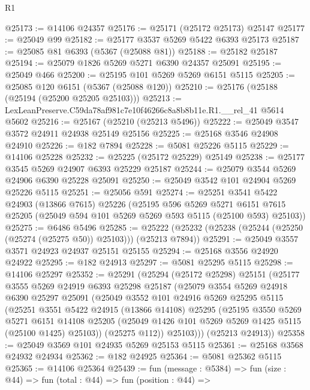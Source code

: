\begin{lexlean}{R1}
\begin{coremodule}
@25173 := @14106 @24357
@25176 := @25171 (@25172 @25173) @25147
@25177 := @25049 @99
@25182 := @25177 @3537 @5269 @5422 @6393 @25173
@25187 := @25085 @81 @6393 (@5367 (@25088 @81))
@25188 := @25182 @25187
@25194 := @25079 @1826 @5269 @5271 @6390 @24357 @25091
@25195 := @25049 @466
@25200 := @25195 @101 @5269 @5269 @6151 @5115
@25205 := @25085 @120 @6151 (@5367 (@25088 @120))
@25210 := @25176 (@25188 (@25194 (@25200 @25205 @25103)))
@25213 := LexLeanPreserve.C59da78af981c7e10f46266c8a8b8b11e.R1.__rel_41 @5614 @5602
@25216 := @25167 (@25210 (@25213 @5496))
@25222 := @25049 @3547 @3572 @24911 @24938 @25149 @25156
@25225 := @25168 @3546 @24908 @24910
@25226 := @182 @7894
@25228 := @5081 @25226 @5115
@25229 := @14106 @25228
@25232 := @25225 (@25172 @25229) @25149
@25238 := @25177 @3545 @5269 @24907 @6393 @25229 @25187
@25244 := @25079 @3544 @5269 @24906 @6390 @25228 @25091
@25250 := @25049 @3542 @101 @24904 @5269 @25226 @5115
@25251 := @25056 @591
@25274 := @25251
    @3541
    @5422
    @24903
    (@13866 @7615)
    @25226
    (@25195
      @596
      @5269
      @5271
      @6151
      @7615
      @25205
      (@25049 @594 @101 @5269 @5269 @593 @5115 (@25100 @593) @25103))
@25275 := @6486 @5496
@25285 := @25222 (@25232 (@25238 (@25244 (@25250 (@25274 (@25275 @50)) @25103))) (@25213 @7894))
@25291 := @25049 @3557 @3571 @24923 @24937 @25151 @25155
@25294 := @25168 @3556 @24920 @24922
@25295 := @182 @24913
@25297 := @5081 @25295 @5115
@25298 := @14106 @25297
@25352 := @25291
    (@25294
      (@25172 @25298)
      @25151
      (@25177
        @3555
        @5269
        @24919
        @6393
        @25298
        @25187
        (@25079
          @3554
          @5269
          @24918
          @6390
          @25297
          @25091
          (@25049
            @3552
            @101
            @24916
            @5269
            @25295
            @5115
            (@25251
              @3551
              @5422
              @24915
              (@13866 @14108)
              @25295
              (@25195
                @3550
                @5269
                @5271
                @6151
                @14108
                @25205
                (@25049 @1426 @101 @5269 @5269 @1425 @5115 (@25100 @1425) @25103))
              (@25275 @112))
            @25103)))
      (@25213 @24913))
@25358 := @25049 @3569 @101 @24935 @5269 @25153 @5115
@25361 := @25168 @3568 @24932 @24934
@25362 := @182 @24925
@25364 := @5081 @25362 @5115
@25365 := @14106 @25364
@25439 := fun (message : @5384) =>
  fun (size : @44) =>
  fun (total : @44) =>
  fun (position : @44) =>

\end{coremodule}
\end{lexlean}
